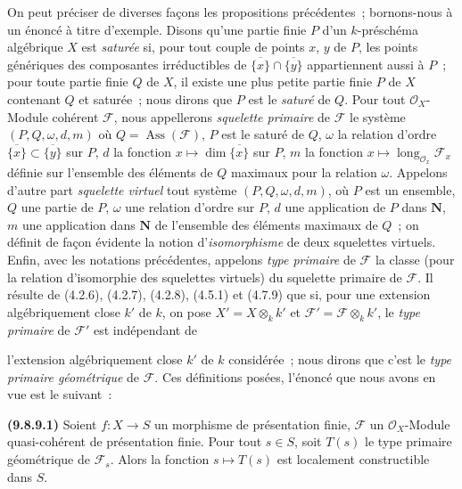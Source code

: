 \begin{remark}[9.8.9]
\label{IV.9.8.9-fr}
On peut préciser de diverses façons les propositions précédentes~;
bornons-nous à un énoncé à titre d'exemple. Disons qu'une partie finie $P$ d'un
$k$-préschéma algébrique $X$ est \emph{saturée} si, pour tout couple de points
$x$, $y$ de $P$, les points génériques des composantes irréductibles de
$\overline{\{x\}}\cap\overline{\{y\}}$ appartiennent aussi à $P$~; pour toute
partie finie $Q$ de $X$, il existe une plus petite partie finie $P$ de $X$
contenant $Q$ et saturée~; nous dirons que $P$ est le \emph{saturé} de $Q$. Pour
tout $\mathcal O_X$-Module cohérent $\mathcal F$, nous appellerons
\emph{squelette primaire} de $\mathcal F$ le système $(P,Q,\omega,d,m)$ où
$Q=\operatorname{Ass}(\mathcal F)$, $P$ est le saturé de $Q$, $\omega$ la
relation d'ordre $\overline{\{x\}}\subset\overline{\{y\}}$ sur $P$, $d$ la
fonction $x\mapsto\dim\overline{\{x\}}$ sur $P$, $m$ la fonction
$x\mapsto\operatorname{long}_{\mathcal O_x}\mathcal F_x$ définie sur l'ensemble
des éléments de $Q$ maximaux pour la relation $\omega$. Appelons d'autre part
\emph{squelette virtuel} tout système $(P,Q,\omega,d,m)$, où $P$ est un
ensemble, $Q$ une partie de $P$, $\omega$ une relation d'ordre sur $P$, $d$ une
application de $P$ dans $\mathbf N$, $m$ une application dans $\mathbf N$ de
l'ensemble des éléments maximaux de $Q$~; on définit de façon évidente la notion
d'\emph{isomorphisme} de deux squelettes virtuels. Enfin, avec les notations
précédentes, appelons \emph{type primaire} de $\mathcal F$ la classe (pour la
relation d'isomorphie des squelettes virtuels) du squelette primaire de
$\mathcal F$. Il résulte de (4.2.6), (4.2.7), (4.2.8), (4.5.1) et (4.7.9) que
si, pour une extension algébriquement close $k'$ de $k$, on pose
$X'=X\otimes_k k'$ et $\mathcal F'=\mathcal F\otimes_k k'$, le
\emph{type primaire} de $\mathcal F'$ est indépendant de


l'extension algébriquement close $k'$ de $k$ considérée~; nous dirons que c'est
le \emph{type primaire géométrique} de $\mathcal F$. Ces définitions posées,
l'énoncé que nous avons en vue est le suivant~:

\label{IV.9.8.9.1-fr}%
\textbf{(9.8.9.1)} Soient $f:X\to S$ un morphisme de présentation finie,
$\mathcal F$ un $\mathcal O_X$-Module quasi-cohérent de présentation finie.
Pour tout $s\in S$, soit $T(s)$ le type primaire géométrique de $\mathcal F_s$.
Alors la fonction $s\mapsto T(s)$ est localement constructible dans $S$.


\end{remark}
